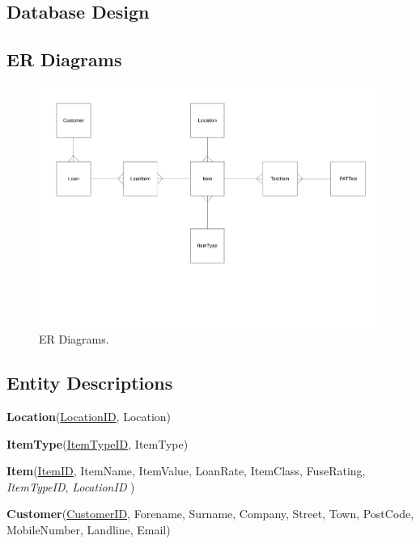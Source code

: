\begin{landscape}

\section{Database Design}

\subsection{ER Diagrams}

\begin{figure}[H]
    \centerline{\includegraphics[width=550px]{./Design/ER_Diagrams/ER_Diagram.pdf}}
    \caption{ER Diagrams.} \label{fig:ER Diagrams}
\end{figure}

\end{landscape}

\subsection{Entity Descriptions}

\noindent \textbf{Location}(\underline{LocationID}, Location)

\noindent \textbf{ItemType}(\underline{ItemTypeID}, ItemType)

\noindent \textbf{Item}(\underline{ItemID}, ItemName, ItemValue, LoanRate, ItemClass, FuseRating,\\ \emph{ItemTypeID}, \emph{LocationID} )

\noindent \textbf{Customer}(\underline{CustomerID}, Forename, Surname, Company, Street, Town, PostCode, MobileNumber, Landline, Email)


